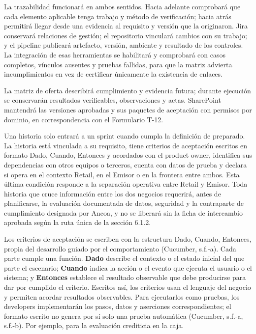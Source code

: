 \documentclass[11pt]{article}
\begin{document}
La trazabilidad funcionará en ambos sentidos. Hacia adelante comprobará
que cada elemento aplicable tenga trabajo y método de verificación;
hacia atrás permitirá llegar desde una evidencia al requisito y versión
que la originaron. Jira conservará relaciones de gestión; el repositorio
vinculará cambios con su trabajo; y el pipeline publicará artefacto,
versión, ambiente y resultado de los controles. La integración de esas
herramientas se habilitará y comprobará con casos completos, vínculos
ausentes y pruebas fallidas, para que la matriz advierta incumplimientos
en vez de certificar únicamente la existencia de enlaces.

La matriz de oferta describirá cumplimiento y evidencia futura; durante
ejecución se conservarán resultados verificables, observaciones y actas.
SharePoint mantendrá las versiones aprobadas y sus paquetes de
aceptación con permisos por dominio, en correspondencia con el
Formulario T-12.

Una historia solo entrará a un sprint cuando cumpla la definición de
preparado. La historia está vinculada a su requisito, tiene criterios de
aceptación escritos en formato Dado, Cuando, Entonces y acordados con el
product owner, identifica sus dependencias con otros equipos o terceros,
cuenta con datos de prueba y declara si opera en el contexto Retail, en
el Emisor o en la frontera entre ambos. Esta última condición responde a
la separación operativa entre Retail y Emisor. Toda historia que cruce
información entre los dos negocios requerirá, antes de planificarse, la
evaluación documentada de datos, seguridad y la contraparte de cumplimiento designada por Ancoa, y no se liberará sin la ficha de intercambio aprobada según la ruta única de la sección 6.1.2.

Los criterios de aceptación se escriben con la estructura Dado, Cuando,
Entonces, propia del desarrollo guiado por el comportamiento (Cucumber,
s.f.-a). Cada parte cumple una función. \textbf{Dado} describe el
contexto o el estado inicial del que parte el escenario; \textbf{Cuando}
indica la acción o el evento que ejecuta el usuario o el sistema; y
\textbf{Entonces} establece el resultado observable que debe producirse
para dar por cumplido el criterio. Escritos así, los criterios usan el
  lenguaje del negocio y permiten acordar resultados observables. Para
ejecutarlos como pruebas, los developers implementarán los pasos, datos
y aserciones correspondientes; el formato escrito no genera por sí solo
una prueba automática (Cucumber, s.f.-a, s.f.-b). Por ejemplo, para la
evaluación crediticia en la caja.
\end{document}
